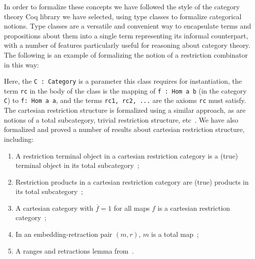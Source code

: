 \documentclass{entcs} \usepackage{entcsmacro}
\begin{document}
In order to formalize these concepts we have followed the style of the category theory Coq library we have selected, using type classes to formalize categorical notions. Type classes are a versatile and convenient way to encapsulate terms and propositions about them into a single term representing its informal counterpart, with a number of features particularly useful for reasoning about category theory. The following is an example of formalizing the notion of a restriction combinator in this way:


\noindent
Here, the {\tt C : Category} is a parameter this class requires for instantiation, the term {\tt rc} in the body of the class is the mapping of {\tt f : Hom a b} (in the category {\tt C}) to {\tt f: Hom a a}, and the terms {\tt rc1, rc2, ...} are the axioms {\tt rc} must satisfy. The cartesian restriction structure is formalized using a similar approach, as are notions of a total subcategory, trivial restriction structure, etc~\cite{Turing}. We have also formalized and proved a number of results about cartesian restriction structure, including:

\begin{enumerate}
\item A restriction terminal object in a cartesian restriction category is a (true) terminal object in its total subcategory~\cite{Turing};
	
\item Restriction products in a cartesian restriction category are (true) products in its total subcategory~\cite{Turing};
	
\item A cartesian category with $\overline{f} = 1$ for all maps $f$ is a cartesian restriction category~\cite{Turing};
	
\item In an embedding-retraction pair $(m, r)$, $m$ is a total map~\cite{Restriction};
	
\item A ranges and retractions lemma from~\cite{MyThesis}.
\end{enumerate}
\end{document}
